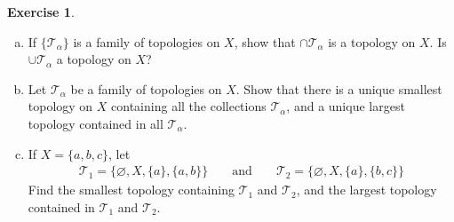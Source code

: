 \documentclass[11pt,a4paper,twoside]{article}
\theoremstyle{definition}
\newcounter{excounter}
\newtheorem{exercise}[excounter]{Exercise}
\begin{document}
\begin{exercise} \hspace{0pt} \\

  \begin{enumerate}[(a)]

  \item If $\{ \mathscr{T}_\alpha \}$ is a family of topologies on $X$, show that $\cap \mathscr{T}_\alpha$
    is a topology on $X$. Is $\cup \mathscr{T}_\alpha$ a topology on $X$?

  \item Let $\mathscr{T}_\alpha$ be a family of topologies on $X$. Show that there is a unique smallest topology on $X$
    containing all the collections $\mathscr{T}_\alpha$, and a unique largest topology contained in all $\mathscr{T}_\alpha$.

  \item If $X = \{ a, b, c \}$, let
    \begin{align*}
      \mathscr{T}_1 = \big\{ \varnothing, X, \{ a \}, \{ a, b \} \big\} &&\text{ and }&& \mathscr{T}_2 = \{ \varnothing, X, \{ a \}, \{ b, c \} \}
    \end{align*}
    Find the smallest topology containing $\mathscr{T}_1$ and $\mathscr{T}_2$, and the largest topology contained in $\mathscr{T}_1$ and $\mathscr{T}_2$.

  \end{enumerate}

\end{exercise}
\end{document}
